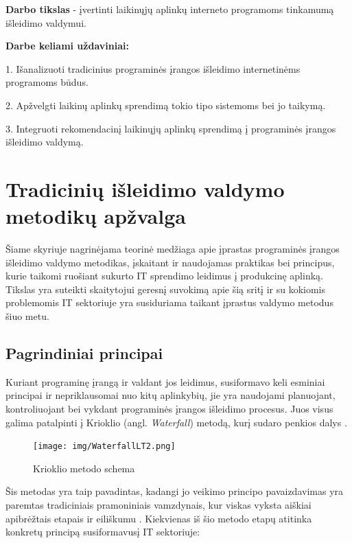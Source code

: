 \documentclass{VUMIFPSkursinis}
\begin{document}
\bigskip

\textbf{Darbo tikslas} - įvertinti laikinųjų aplinkų interneto programoms tinkamumą išleidimo valdymui. 

\textbf{Darbe keliami uždaviniai:}

1. Išanalizuoti tradicinius programinės įrangos išleidimo internetinėms programoms būdus.

2. Apžvelgti laikinų aplinkų sprendimą tokio tipo sistemoms bei jo taikymą.

3. Integruoti rekomendacinį laikinųjų aplinkų sprendimą į programinės įrangos išleidimo valdymą.

\section{Tradicinių išleidimo valdymo metodikų apžvalga}
Šiame skyriuje nagrinėjama teorinė medžiaga apie įprastas programinės įrangos išleidimo valdymo metodikas, įskaitant ir naudojamas praktikas bei principus, kurie taikomi ruošiant sukurto IT sprendimo leidimus į produkcinę aplinką. Tikslas yra suteikti skaitytojui geresnį suvokimą apie šią sritį ir su kokiomis problemomis IT sektoriuje yra susiduriama taikant įprastus valdymo metodus šiuo metu.

\subsection{Pagrindiniai principai}
Kuriant programinę įrangą ir valdant jos leidimus, susiformavo keli esminiai principai ir nepriklausomai nuo kitų aplinkybių, jie yra naudojami planuojant, kontroliuojant bei vykdant programinės įrangos išleidimo procesus. Juos visus galima patalpinti į Krioklio (angl. \textit{Waterfall}) metodą, kurį sudaro penkios dalys \cite{SaltTrecias}.

\begin{figure}[H]
    \centering
    \texttt{[image: img/WaterfallLT2.png]}
    \caption{Krioklio metodo schema}
    \label{img:mlp}
\end{figure}

Šis metodas yra taip pavadintas, kadangi jo veikimo principo pavaizdavimas yra paremtas tradiciniais pramoniniais vamzdynais, kur viskas vyksta aiškiai apibrėžtais etapais ir eiliškumu \cite{SaltTrecias}. Kiekvienas iš šio metodo etapų atitinka konkretų principą susiformavusį IT sektoriuje:
\end{document}
